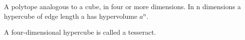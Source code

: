 A polytope analogous to a cube, in four or more dimensions. In n dimensions 
a hypercube of edge length a has hypervolume $a^{n}.$ 
\par
A four-dimensional hypercube is called a tesseract.